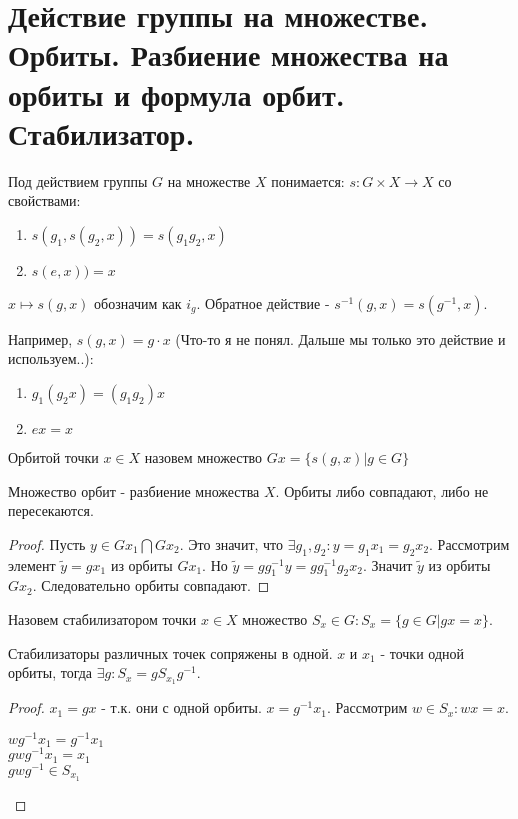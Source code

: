\section{Действие группы на множестве. Орбиты. Разбиение множества на орбиты и формула орбит. Стабилизатор.}

\begin{defn}
Под действием группы $G$ на множестве $X$ понимается: $s: G \times X \rightarrow X$ со свойствами:
\begin{enumerate}
  \item $s(g_1, s(g_2, x)) = s(g_1 g_2, x)$
  \item $s(e, x)) = x$
\end{enumerate}
\end{defn}

\vspace{0.5cm}
$x \mapsto s(g, x)$ обозначим как $i_g$. Обратное действие - $s^{-1}(g, x) = s(g^{-1}, x)$. \\
\par Например, $s(g, x) = g \cdot x$ (Что-то я не понял. Дальше мы только это действие и используем..):
\begin{enumerate}
 \item $g_1(g_2x) = (g_1g_2)x$
 \item $ex = x$
\end{enumerate}

\begin{defn}
Орбитой точки $x \in X$ назовем множество $Gx = \{ s(g, x) | g \in G \}$
\end{defn}

\begin{lem}
Множество орбит - разбиение множества $X$. Орбиты либо совпадают, либо не пересекаются.
\end{lem}
\begin{proof}
Пусть $y \in G{x_1} \bigcap G{x_2}$. Это значит, что $ \exists g_1, g_2: y = g_1x_1 = g_2x_2$.
Рассмотрим элемент $\widetilde{y} = gx_1$ из орбиты $G{x_1}$. Но $\widetilde{y} = gg^{-1}_1y = gg^{-1}_1g_2x_2$. 
Значит $\widetilde{y}$ из орбиты $G{x_2}$. Следовательно орбиты совпадают.
\end{proof}

\begin{defn}
Назовем стабилизатором точки $x \in X$ множество $S_x \in G: S_x = \{g \in G | gx = x \}$.
\end{defn}

\begin{lem}
Стабилизаторы различных точек сопряжены в одной. $x$ и $x_1$ - точки одной орбиты,
тогда $\exists g: S_x = gS_{x_1}g^{-1}$.
\end{lem}
\begin{proof}
$x_1 = gx$ - т.к. они с одной орбиты. $x = g^{-1}x_1$. Рассмотрим $w \in S_x: wx = x$. 
\begin{center}
$wg^{-1}x_1 = g^{-1}x_1$\\
$gwg^{-1}x_1 = x_1$\\
$gwg^{-1} \in S_{x_1}$
\end{center}
\end{proof}

